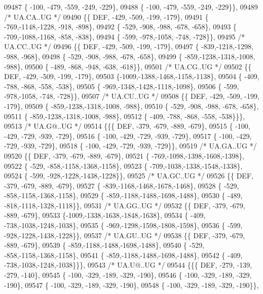\begin{DoxyCode}
09487 \{ -100, -479, -559, -249, -229\},
09488 \{ -100, -479, -559, -249, -229\}\},
09489 \textcolor{comment}{/* UA.CA..UG */}
09490 \{\{  DEF, -429, -509, -199, -179\},
09491 \{ -769,-1148,-1228, -918, -898\},
09492 \{ -529, -908, -988, -678, -658\},
09493 \{ -709,-1088,-1168, -858, -838\},
09494 \{ -599, -978,-1058, -748, -728\}\},
09495 \textcolor{comment}{/* UA.CC..UG */}
09496 \{\{  DEF, -429, -509, -199, -179\},
09497 \{ -839,-1218,-1298, -988, -968\},
09498 \{ -529, -908, -988, -678, -658\},
09499 \{ -859,-1238,-1318,-1008, -988\},
09500 \{ -489, -868, -948, -638, -618\}\},
09501 \textcolor{comment}{/* UA.CG..UG */}
09502 \{\{  DEF, -429, -509, -199, -179\},
09503 \{-1009,-1388,-1468,-1158,-1138\},
09504 \{ -409, -788, -868, -558, -538\},
09505 \{ -969,-1348,-1428,-1118,-1098\},
09506 \{ -599, -978,-1058, -748, -728\}\},
09507 \textcolor{comment}{/* UA.CU..UG */}
09508 \{\{  DEF, -429, -509, -199, -179\},
09509 \{ -859,-1238,-1318,-1008, -988\},
09510 \{ -529, -908, -988, -678, -658\},
09511 \{ -859,-1238,-1318,-1008, -988\},
09512 \{ -409, -788, -868, -558, -538\}\}\},
09513 \textcolor{comment}{/* UA.G@..UG */}
09514 \{\{\{  DEF, -379, -679, -889, -679\},
09515 \{ -100, -429, -729, -939, -729\},
09516 \{ -100, -429, -729, -939, -729\},
09517 \{ -100, -429, -729, -939, -729\},
09518 \{ -100, -429, -729, -939, -729\}\},
09519 \textcolor{comment}{/* UA.GA..UG */}
09520 \{\{  DEF, -379, -679, -889, -679\},
09521 \{ -769,-1098,-1398,-1608,-1398\},
09522 \{ -529, -858,-1158,-1368,-1158\},
09523 \{ -709,-1038,-1338,-1548,-1338\},
09524 \{ -599, -928,-1228,-1438,-1228\}\},
09525 \textcolor{comment}{/* UA.GC..UG */}
09526 \{\{  DEF, -379, -679, -889, -679\},
09527 \{ -839,-1168,-1468,-1678,-1468\},
09528 \{ -529, -858,-1158,-1368,-1158\},
09529 \{ -859,-1188,-1488,-1698,-1488\},
09530 \{ -489, -818,-1118,-1328,-1118\}\},
09531 \textcolor{comment}{/* UA.GG..UG */}
09532 \{\{  DEF, -379, -679, -889, -679\},
09533 \{-1009,-1338,-1638,-1848,-1638\},
09534 \{ -409, -738,-1038,-1248,-1038\},
09535 \{ -969,-1298,-1598,-1808,-1598\},
09536 \{ -599, -928,-1228,-1438,-1228\}\},
09537 \textcolor{comment}{/* UA.GU..UG */}
09538 \{\{  DEF, -379, -679, -889, -679\},
09539 \{ -859,-1188,-1488,-1698,-1488\},
09540 \{ -529, -858,-1158,-1368,-1158\},
09541 \{ -859,-1188,-1488,-1698,-1488\},
09542 \{ -409, -738,-1038,-1248,-1038\}\}\},
09543 \textcolor{comment}{/* UA.U@..UG */}
09544 \{\{\{  DEF, -279, -139, -279, -140\},
09545 \{ -100, -329, -189, -329, -190\},
09546 \{ -100, -329, -189, -329, -190\},
09547 \{ -100, -329, -189, -329, -190\},
09548 \{ -100, -329, -189, -329, -190\}\},

\end{DoxyCode}
